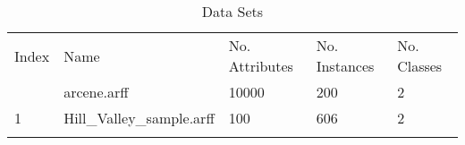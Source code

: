 \begin{table*}[h]
\caption{Data Sets}
\label{tbl:datasets}\begin{tabular}{lllll}
\noalign{\smallskip}\hline\noalign{\smallskip}
Index&Name&No. Attributes&No. Instances&No. Classes\\\noalign{\smallskip}\hline
0&arcene.arff&10000&200&2\\
1&Hill_Valley_sample.arff&100&606&2\\
\noalign{\smallskip}\hline
\end{tabular}
\end{table*}